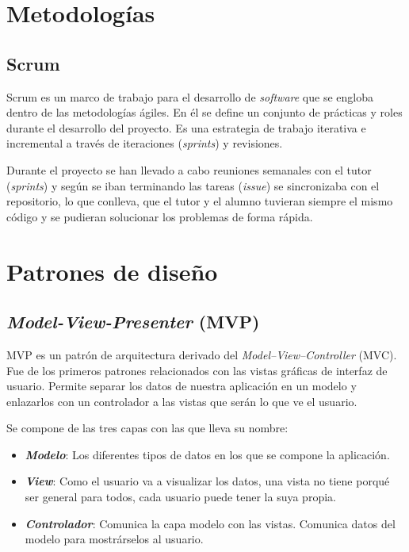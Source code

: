 
\section{Metodologías}\label{metodologias}

\subsection{Scrum}\label{scrum}

Scrum es un marco de trabajo para el desarrollo de \emph{software} que se
engloba dentro de las metodologías ágiles. En él se define un conjunto de prácticas y roles durante el desarrollo del proyecto. Es una estrategia de trabajo iterativa e incremental a través de iteraciones (\emph{sprints})
y revisiones. 

Durante el proyecto se han llevado a cabo reuniones semanales con el tutor (\emph{sprints}) y según se iban terminando las tareas (\emph{issue}) se sincronizaba con el repositorio, lo que conlleva, que el tutor y el alumno tuvieran siempre el mismo código y se pudieran solucionar los problemas de forma rápida. \cite{Schwaber2004}

\section{Patrones de diseño}\label{patrones-de-diseno}

\subsection{\emph{Model-View-Presenter} (MVP)}\label{model-view-presenter-mvp}

MVP es un patrón de arquitectura derivado del
\emph{Model--View--Controller} (MVC). Fue de los primeros patrones relacionados con las vistas gráficas de interfaz de usuario. Permite separar los datos de nuestra aplicación en un modelo y enlazarlos con un controlador a las vistas que serán lo que ve el usuario.\cite{art:mvc}

Se compone de las tres capas con las que lleva su nombre:

\begin{itemize}
	\tightlist
	\item
	\textit{\textbf{Modelo}}: Los diferentes tipos de datos en los que se compone la aplicación.
	\item
	\textit{\textbf{View}}: Como el usuario va a visualizar los datos, una vista no tiene porqué ser general para todos, cada usuario puede tener la suya propia.
	\item
	\textit{\textbf{Controlador}}: Comunica la capa modelo con las vistas. Comunica datos del modelo para mostrárselos al usuario.
\end{itemize}

